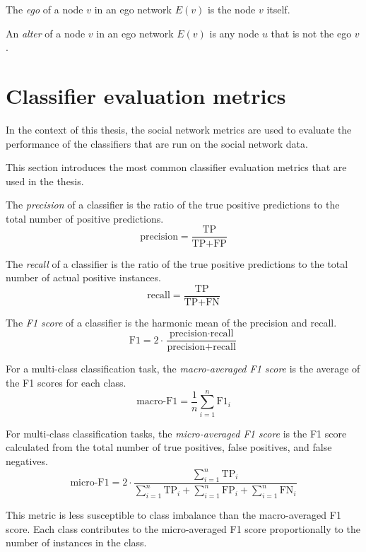 \begin{definition}
    The \textit{ego} of a node $v$ in an ego network $E(v)$ is the node $v$ itself.
\end{definition}

\begin{definition}
    An \textit{alter} of a node $v$ in an ego network $E(v)$ is any node $u$ that is not the ego $v$.
\end{definition}

\section{Classifier evaluation metrics}

In the context of this thesis, the social network metrics are used to evaluate 
the performance of the classifiers that are run on the social network data.

This section introduces the most common classifier evaluation metrics that are used in the thesis.

\begin{definition}[Precision]
    The \textit{precision} of a classifier is the ratio of the true positive predictions to the total number of positive predictions.
    $$
    \text{precision} = \frac{\text{TP}}{\text{TP} + \text{FP}}
    $$
\end{definition}

\begin{definition}[Recall]
    The \textit{recall} of a classifier is the ratio of the true positive predictions to the total number of actual positive instances.
    $$
    \text{recall} = \frac{\text{TP}}{\text{TP} + \text{FN}}
    $$
\end{definition}

\begin{definition}[F1 score]
    The \textit{F1 score} of a classifier is the harmonic mean of the precision and recall.
    $$
    \text{F1} = 2 \cdot \frac{\text{precision} \cdot \text{recall}}{\text{precision} + \text{recall}}
    $$
\end{definition}

\begin{definition}
    For a multi-class classification task, the \textit{macro-averaged F1 score} is the average of the F1 scores for each class.
    $$
    \text{macro-F1} = \frac{1}{n} \sum_{i=1}^{n} \text{F1}_i
    $$
\end{definition}

\begin{definition}
    For multi-class classification tasks, the \textit{micro-averaged F1 score} is the F1 score calculated from the total number of true positives, false positives, and false negatives.
    $$
    \text{micro-F1} = 2 \cdot \frac{\sum_{i=1}^{n} \text{TP}_i}{\sum_{i=1}^{n} \text{TP}_i + \sum_{i=1}^{n} \text{FP}_i + \sum_{i=1}^{n} \text{FN}_i}
    $$

    This metric is less susceptible to class imbalance than the macro-averaged F1 score.
    Each class contributes to the micro-averaged F1 score proportionally to the number of instances in the class.
\end{definition}